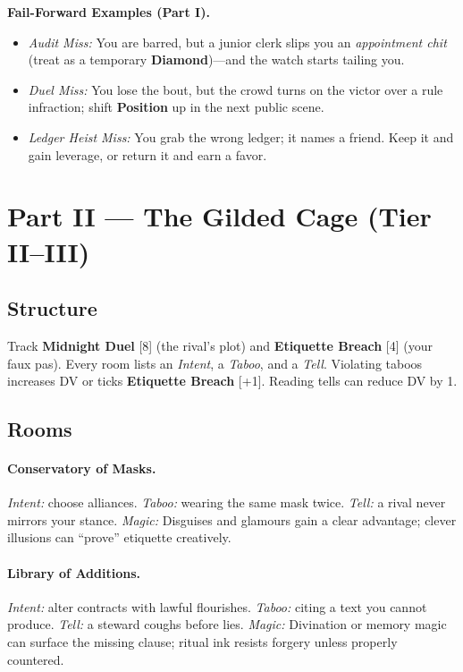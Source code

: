 \documentclass[11pt]{article}
\newcommand{\Clock}[2]{\textbf{#1} [#2]}
\newcommand{\Term}[1]{\textbf{#1}}
\newcommand{\Position}{\Term{Position}}
\newcommand{\Diamond}{\Term{Diamond}}
\begin{document}
\begin{tcolorbox}[breakable]
\textbf{Fail-Forward Examples (Part I).}
\begin{itemize}
\item \emph{Audit Miss:} You are barred, but a junior clerk slips you an \emph{appointment chit} (treat as a temporary \Diamond{})---and the watch starts tailing you.
\item \emph{Duel Miss:} You lose the bout, but the crowd turns on the victor over a rule infraction; shift \Position{} up in the next public scene.
\item \emph{Ledger Heist Miss:} You grab the wrong ledger; it names a friend. Keep it and gain leverage, or return it and earn a favor.
\end{itemize}
\end{tcolorbox}

\section*{Part II --- The Gilded Cage (Tier II--III)}

\subsection*{Structure}
Track \Clock{Midnight Duel}{8} (the rival's plot) and \Clock{Etiquette Breach}{4} (your faux pas). Every room lists an \emph{Intent}, a \emph{Taboo}, and a \emph{Tell}. Violating taboos increases DV or ticks \Clock{Etiquette Breach}{+1}. Reading tells can reduce DV by 1.

\subsection*{Rooms}
\paragraph{Conservatory of Masks.} \emph{Intent:} choose alliances. \emph{Taboo:} wearing the same mask twice. \emph{Tell:} a rival never mirrors your stance. \emph{Magic:} Disguises and glamours gain a clear advantage; clever illusions can ``prove'' etiquette creatively.

\paragraph{Library of Additions.} \emph{Intent:} alter contracts with lawful flourishes. \emph{Taboo:} citing a text you cannot produce. \emph{Tell:} a steward coughs before lies. \emph{Magic:} Divination or memory magic can surface the missing clause; ritual ink resists forgery unless properly countered.
\end{document}
